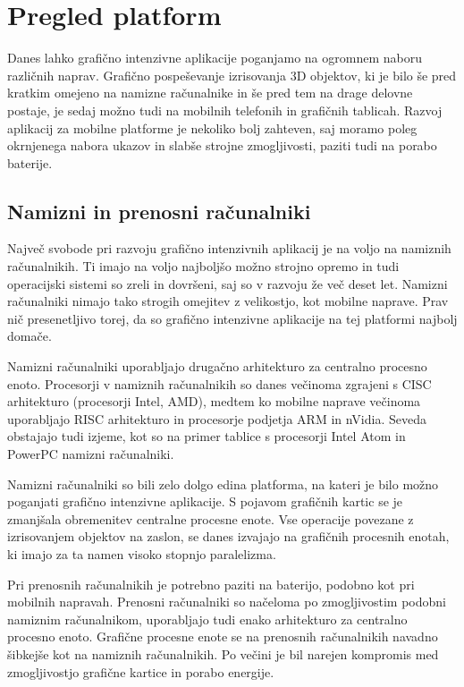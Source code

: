 \chapter{Pregled platform}

Danes lahko grafično intenzivne aplikacije poganjamo na ogromnem naboru različnih naprav. Grafično pospeševanje izrisovanja 3D objektov, ki je bilo še pred kratkim omejeno na namizne računalnike in še pred tem na drage delovne postaje, je sedaj možno tudi na mobilnih telefonih in grafičnih tablicah. Razvoj aplikacij za mobilne platforme je nekoliko bolj zahteven, saj moramo poleg okrnjenega nabora ukazov in slabše strojne zmogljivosti, paziti tudi na porabo baterije.

\section{Namizni in prenosni računalniki}

Največ svobode pri razvoju grafično intenzivnih aplikacij je na voljo na namiznih računalnikih. Ti imajo na voljo najboljšo možno strojno opremo in tudi operacijski sistemi so zreli in dovršeni, saj so v razvoju že več deset let. Namizni računalniki nimajo tako strogih omejitev z velikostjo, kot mobilne naprave. Prav nič presenetljivo torej, da so grafično intenzivne aplikacije na tej platformi najbolj domače. 

Namizni računalniki uporabljajo drugačno arhitekturo za centralno procesno enoto. Procesorji v namiznih računalnikih so danes večinoma  zgrajeni s CISC arhitekturo (procesorji Intel, AMD), medtem ko mobilne naprave večinoma uporabljajo RISC arhitekturo in procesorje podjetja ARM in nVidia. Seveda obstajajo tudi izjeme, kot so na primer tablice s procesorji Intel Atom in PowerPC namizni računalniki.  

Namizni računalniki so bili zelo dolgo edina platforma, na kateri je bilo možno poganjati grafično intenzivne aplikacije. S pojavom grafičnih kartic se je zmanjšala obremenitev centralne procesne enote. Vse operacije povezane z izrisovanjem objektov na zaslon, se danes izvajajo na grafičnih procesnih enotah, ki imajo za ta namen visoko stopnjo paralelizma. 

Pri prenosnih računalnikih je potrebno paziti na baterijo, podobno kot pri mobilnih napravah. Prenosni računalniki so načeloma po zmogljivostim podobni namiznim računalnikom, uporabljajo tudi enako arhitekturo za centralno procesno enoto. Grafične procesne enote se na prenosnih računalnikih navadno šibkejše kot na namiznih računalnikih. Po večini je bil narejen kompromis med zmogljivostjo grafične kartice in porabo energije.

